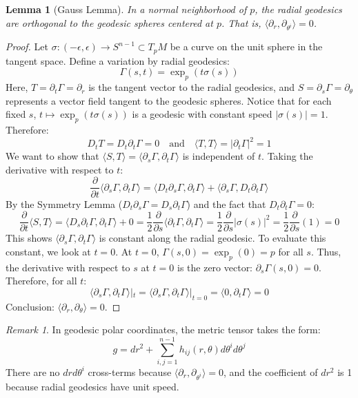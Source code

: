 \documentclass[11pt, a4paper]{article}
\theoremstyle{plain}
\newtheorem{lemma}[theorem]{Lemma}
\theoremstyle{definition}
\theoremstyle{remark}
\newtheorem{remark}[theorem]{Remark}
\begin{document}
{\begin{lemma}[Gauss Lemma]
In a normal neighborhood of $p$, the radial geodesics are orthogonal to the geodesic spheres centered at $p$. That is, $\langle \partial_r, \partial_{\theta^i} \rangle = 0$.
\end{lemma}

\begin{proof}
Let $\sigma: (-\epsilon, \epsilon) \to S^{n-1} \subset T_p M$ be a curve on the unit sphere in the tangent space. Define a variation by radial geodesics:
\[ \Gamma(s,t) = \exp_p(t \sigma(s)) \]
Here, $T = \partial_t \Gamma = \partial_r$ is the tangent vector to the radial geodesics, and $S = \partial_s \Gamma = \partial_\theta$ represents a vector field tangent to the geodesic spheres.
Notice that for each fixed $s$, $t \mapsto \exp_p(t \sigma(s))$ is a geodesic with constant speed $|\sigma(s)| = 1$. Therefore:
\[ D_t T = D_t \partial_t \Gamma = 0 \quad \text{and} \quad \langle T, T \rangle = |\partial_t \Gamma|^2 = 1 \]
We want to show that $\langle S, T \rangle = \langle \partial_s \Gamma, \partial_t \Gamma \rangle$ is independent of $t$. Taking the derivative with respect to $t$:
\[ \frac{\partial}{\partial t} \langle \partial_s \Gamma, \partial_t \Gamma \rangle = \langle D_t \partial_s \Gamma, \partial_t \Gamma \rangle + \langle \partial_s \Gamma, D_t \partial_t \Gamma \rangle \]
By the Symmetry Lemma ($D_t \partial_s \Gamma = D_s \partial_t \Gamma$) and the fact that $D_t \partial_t \Gamma = 0$:
\[ \frac{\partial}{\partial t} \langle S, T \rangle = \langle D_s \partial_t \Gamma, \partial_t \Gamma \rangle + 0 = \frac{1}{2} \frac{\partial}{\partial s} \langle \partial_t \Gamma, \partial_t \Gamma \rangle = \frac{1}{2} \frac{\partial}{\partial s} |\sigma(s)|^2 = \frac{1}{2} \frac{\partial}{\partial s}(1) = 0 \]
This shows $\langle \partial_s \Gamma, \partial_t \Gamma \rangle$ is constant along the radial geodesic. 
To evaluate this constant, we look at $t=0$. At $t=0$, $\Gamma(s,0) = \exp_p(0) = p$ for all $s$. Thus, the derivative with respect to $s$ at $t=0$ is the zero vector: $\partial_s \Gamma(s, 0) = 0$. 
Therefore, for all $t$:
\[ \langle \partial_s \Gamma, \partial_t \Gamma \rangle|_{t} = \langle \partial_s \Gamma, \partial_t \Gamma \rangle|_{t=0} = \langle 0, \partial_t \Gamma \rangle = 0 \]
Conclusion: $\langle \partial_r, \partial_\theta \rangle = 0$.
\end{proof}

\begin{remark}
In geodesic polar coordinates, the metric tensor takes the form:
\[ g = dr^2 + \sum_{i,j=1}^{n-1} h_{ij}(r, \theta) d\theta^i d\theta^j \]
There are no $dr d\theta^i$ cross-terms because $\langle \partial_r, \partial_{\theta^i} \rangle = 0$, and the coefficient of $dr^2$ is 1 because radial geodesics have unit speed.
\end{remark}

}
\end{document}
